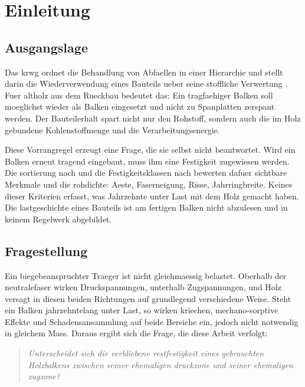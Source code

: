 \chapter{Einleitung}
\label{ch:introduction}

\section{Ausgangslage}
\label{sec:motivation}

Das \acrfull{krwg} ordnet die Behandlung von Abfaellen in einer Hierarchie und
stellt darin die Wiederverwendung eines Bauteils ueber seine stoffliche
Verwertung \parencite{krwg,eu2008waste}. Fuer \gls{altholz} aus dem Rueckbau
bedeutet das: Ein tragfaehiger Balken soll moeglichst wieder als Balken
eingesetzt und nicht zu Spanplatten zerspant werden. Der Bauteilerhalt spart
nicht nur den Rohstoff, sondern auch die im Holz gebundene Kohlenstoffmenge
und die Verarbeitungsenergie.

Diese Vorrangregel erzeugt eine Frage, die sie selbst nicht beantwortet. Wird
ein Balken erneut tragend eingebaut, muss ihm eine Festigkeit zugewiesen
werden. Die \gls{sortierung} nach \parencite{din4074} und die
Festigkeitsklassen nach \parencite{en338} bewerten dafuer sichtbare Merkmale
und die \gls{rohdichte}: Aeste, Faserneigung, Risse, Jahrringbreite. Keines
dieser Kriterien erfasst, was Jahrzehnte unter Last mit dem Holz gemacht
haben. Die \gls{lastgeschichte} eines Bauteils ist am fertigen Balken nicht
abzulesen und in keinem Regelwerk abgebildet.

\section{Fragestellung}
\label{sec:research-question}

Ein biegebeanspruchter Traeger ist nicht gleichmaessig belastet. Oberhalb der
\gls{neutralefaser} wirken Druckspannungen, unterhalb Zugspannungen, und Holz
versagt in diesen beiden Richtungen auf grundlegend verschiedene Weise. Steht
ein Balken jahrzehntelang unter Last, so wirken \gls{kriechen},
mechano-sorptive Effekte und Schadensansammlung auf beide Bereiche ein, jedoch
nicht notwendig in gleichem Mass. Daraus ergibt sich die Frage, die diese
Arbeit verfolgt:

\begin{quote}
\textit{Unterscheidet sich die verbliebene \gls{restfestigkeit} eines
gebrauchten Holzbalkens zwischen seiner ehemaligen \gls{druckzone} und seiner
ehemaligen \gls{zugzone}?}
\end{quote}

